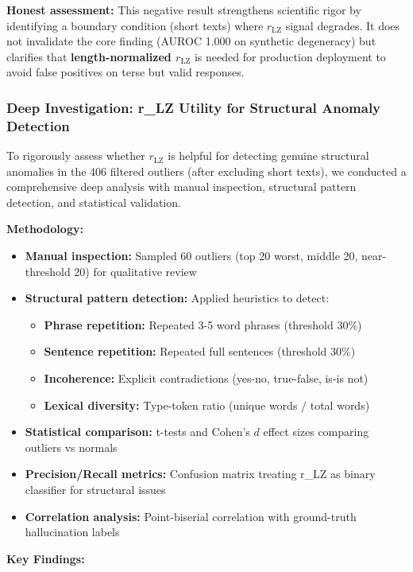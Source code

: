 \documentclass[11pt]{article}
\begin{document}
\textbf{Honest assessment:} This negative result strengthens scientific rigor by identifying a boundary condition (short texts) where $r_{\text{LZ}}$ signal degrades. It does not invalidate the core finding (AUROC 1.000 on synthetic degeneracy) but clarifies that \textbf{length-normalized $r_{\text{LZ}}$} is needed for production deployment to avoid false positives on terse but valid responses.

\subsubsection{Deep Investigation: r\_LZ Utility for Structural Anomaly Detection}

To rigorously assess whether $r_{\text{LZ}}$ is helpful for detecting genuine structural anomalies in the 406 filtered outliers (after excluding short texts), we conducted a comprehensive deep analysis with manual inspection, structural pattern detection, and statistical validation.

\textbf{Methodology:}
\begin{itemize}
\item \textbf{Manual inspection:} Sampled 60 outliers (top 20 worst, middle 20, near-threshold 20) for qualitative review
\item \textbf{Structural pattern detection:} Applied heuristics to detect:
  \begin{itemize}
  \item \textbf{Phrase repetition:} Repeated 3-5 word phrases (threshold 30\%)
  \item \textbf{Sentence repetition:} Repeated full sentences (threshold 30\%)
  \item \textbf{Incoherence:} Explicit contradictions (yes-no, true-false, is-is not)
  \item \textbf{Lexical diversity:} Type-token ratio (unique words / total words)
  \end{itemize}
\item \textbf{Statistical comparison:} t-tests and Cohen's $d$ effect sizes comparing outliers vs normals
\item \textbf{Precision/Recall metrics:} Confusion matrix treating r\_LZ as binary classifier for structural issues
\item \textbf{Correlation analysis:} Point-biserial correlation with ground-truth hallucination labels
\end{itemize}

\textbf{Key Findings:}
\end{document}

